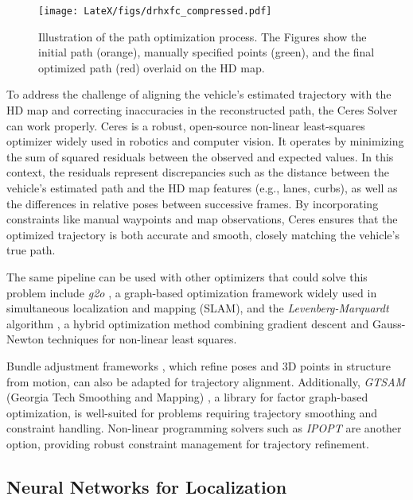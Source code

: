 \begin{figure}[H]
    \centering
    \texttt{[image: LateX/figs/drhxfc\_compressed.pdf]}
    \caption{Illustration of the path optimization process. The Figures show the initial path (orange), manually specified points (green), and the final optimized path (red) overlaid on the HD map.}
    \label{fig:optimizer}
\end{figure}

To address the challenge of aligning the vehicle's estimated trajectory with the HD map and correcting inaccuracies in the reconstructed path, the Ceres Solver \cite{Agarwal_Ceres_Solver_2022} can work properly. Ceres is a robust, open-source non-linear least-squares optimizer widely used in robotics and computer vision. It operates by minimizing the sum of squared residuals between the observed and expected values. In this context, the residuals represent discrepancies such as the distance between the vehicle's estimated path and the HD map features (e.g., lanes, curbs), as well as the differences in relative poses between successive frames. By incorporating constraints like manual waypoints and map observations, Ceres ensures that the optimized trajectory is both accurate and smooth, closely matching the vehicle's true path. 

The same pipeline can be used with other optimizers that could solve this problem include \textit{g2o} \cite{Kummerle_g2o_2011}, a graph-based optimization framework widely used in simultaneous localization and mapping (SLAM), and the \textit{Levenberg-Marquardt} algorithm \cite{Levenberg_LMA_1944, Marquardt_LMA_1963}, a hybrid optimization method combining gradient descent and Gauss-Newton techniques for non-linear least squares. 

Bundle adjustment frameworks \cite{Triggs_BA_1999}, which refine poses and 3D points in structure from motion, can also be adapted for trajectory alignment. Additionally, \textit{GTSAM} (Georgia Tech Smoothing and Mapping) \cite{Dellaert_GTSAM_2012}, a library for factor graph-based optimization, is well-suited for problems requiring trajectory smoothing and constraint handling. Non-linear programming solvers such as \textit{IPOPT} \cite{Wachter_IPOPT_2006} are another option, providing robust constraint management for trajectory refinement. 

\subsection*{Neural Networks for Localization}

